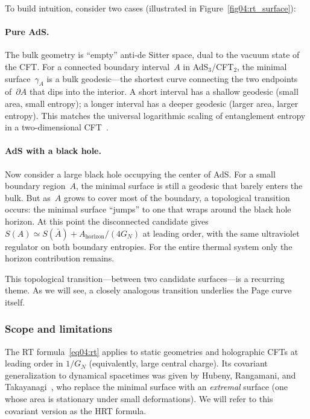 \documentclass[11pt,letterpaper]{article}
\theoremstyle{plain}
\theoremstyle{definition}
\theoremstyle{remark}
\begin{document}
To build intuition, consider two cases (illustrated in
Figure~\ref{fig04:rt_surface}):

\paragraph{Pure AdS.}
The bulk geometry is ``empty'' anti-de Sitter space, dual to the
vacuum state of the CFT.  For a connected boundary interval~$A$ in
AdS$_3$/CFT$_2$, the minimal surface~$\gamma_{A}$ is a bulk
geodesic---the shortest curve connecting the two endpoints
of~$\partial A$ that dips into the interior.  A short interval has a
shallow geodesic (small area, small entropy); a longer interval has a
deeper geodesic (larger area, larger entropy).  This matches the
universal logarithmic scaling of entanglement entropy in a
two-dimensional CFT~\citep{calabresecardy2004}.

\paragraph{AdS with a black hole.}
Now consider a large black hole occupying the center of AdS.  For a
small boundary region~$A$, the minimal surface is still a geodesic
that barely enters the bulk.  But as~$A$ grows to cover most of the
boundary, a topological transition occurs: the minimal surface
``jumps'' to one that wraps around the black hole horizon.  At this
point the disconnected candidate gives
$S(A)\simeq S(\bar A)+A_{\mathrm{horizon}}/(4G_N)$ at leading order,
with the same ultraviolet regulator on both boundary entropies. For the
entire thermal system only the horizon contribution remains.

This topological transition---between two candidate surfaces---is a
recurring theme.  As we will see, a closely analogous transition
underlies the Page curve itself.

\subsubsection*{Scope and limitations}

The RT formula~\eqref{eq04:rt} applies to static geometries and
holographic CFTs at leading order in $1/G_N$ (equivalently, large
central charge).  Its covariant generalization to dynamical spacetimes
was given by Hubeny, Rangamani, and
Takayanagi~\citeyearpar{hubenyetal2007}, who replace the minimal surface
with an \emph{extremal} surface (one whose area is stationary under
small deformations).  We will refer to this covariant version as the
HRT formula.
\end{document}
